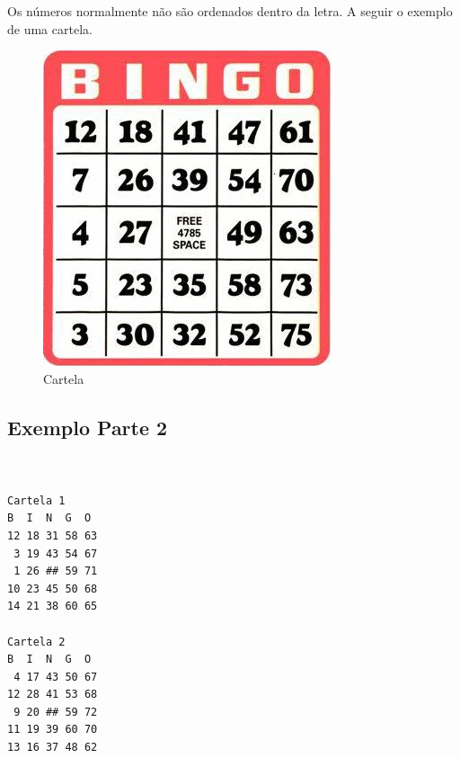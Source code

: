 \documentclass[12pt]{article}
\begin{document}
Os números normalmente não são ordenados dentro da letra. A seguir o exemplo de uma
cartela.

\begin{figure}[h]
\centering
\includegraphics[width=0.6\linewidth]{./imagens/cartela}
\caption{Cartela}
\end{figure}

\subsection{Exemplo Parte 2}

\begin{verbatim}


Cartela 1
B  I  N  G  O
12 18 31 58 63 
 3 19 43 54 67 
 1 26 ## 59 71 
10 23 45 50 68 
14 21 38 60 65 

Cartela 2
B  I  N  G  O
 4 17 43 50 67 
12 28 41 53 68 
 9 20 ## 59 72 
11 19 39 60 70 
13 16 37 48 62
\end{verbatim}

\begin{verbatim}


\end{verbatim}
\end{document}
